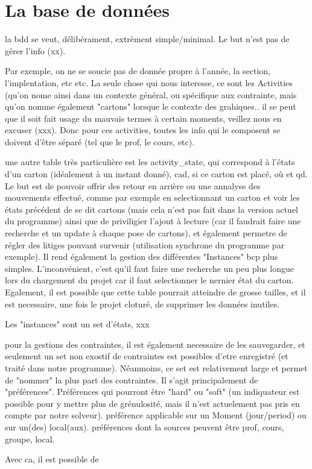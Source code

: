 \section{La base de données}
la bdd se veut, délibérament, extrèment simple/minimal.  Le but n'est pas de gérer l'info (xx).

Par exemple, on ne se soucie pas de donnée propre à l'année, la section, l'implentation, etc etc.  La seule chose qui nous interesse, ce sont les Activities (qu'on nome ainsi dans un contexte général, ou spécifique aux contrainte, mais qu'on nomme également "cartons" lorsque le contexte des grahiques.. il se peut que il soit fait usage du mauvais termes à certain moments, veillez nous en excuser (xxx).
Donc pour ces activities, toutes les info qui le composent se doivent d'être séparé (tel que le prof, le cours, etc).

une autre table très particulière est les activity_state, qui correspond à l'états d'un carton (idéalement à un instant donné), cad, si ce carton est placé, où et qd.  Le but est de pouvoir offrir des retour en arrière ou une annalyse des mouvements effectué, comme par exemple en selectionnant un carton et voir les états précédent de se dit cartons (mais cela n'est pas fait dans la version actuel du programme) ainsi que de priviligier l'ajout à lecture (car il faudrait faire une recherche et un update à chaque pose de cartons), et également permetre de régler des litiges pouvant survenir (utilisation synchrone du programme par exemple).  Il rend également la gestion des différentes "Instances" bcp plus simples.  L'inconvénient, c'est qu'il faut faire une recherche un peu plus longue lors du chargement du projet car il faut selectionner le nernier état du carton. Egalement, il est possible que cette table pourrait atteindre de grosse tailles, et il est necessaire, une fois le projet cloturé, de supprimer les données inutiles. 

Les "instances" sont un set d'états, xxx

pour la gestions des contraintes, il est également necessaire de les sauvegarder, et seulement un set non exostif de contraintes est possibles d'etre enregistré (et traité dans notre programme). Néanmoins, ce set est relativement large et permet de "nommer" la plus part des contraintes.  Il s'agit principalement de "préférences".  Préférences qui pourront être "hard" ou "soft" (un indiquateur est possible pour y mettre plus de grénulosité, mais il n'est actuelement pas pris en compte par notre solveur).  préférence applicable sur un Moment (jour/period) ou sur un(des) local(aux).  préférences dont la sources peuvent être prof, cours, groupe, local.

Avec ca, il est possible de 

